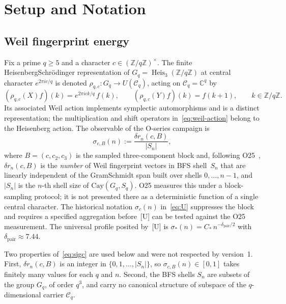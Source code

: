 \documentclass[12pt,a4paper]{article}
\theoremstyle{definition}
\theoremstyle{remark}
\DeclareMathOperator{\Heis}{Heis}
\newcommand{\Cq}{\mathcal{C}_q}
\newcommand{\dpair}{\delta_{\mathrm{pair}}}
\newcommand{\rhoc}{\rho_{q,c}}
\newcommand{\sigc}{\sigma_c}
\begin{document}
  \section{Setup and Notation}\label{sec:setup}

    \subsection{Weil fingerprint energy}

      Fix a prime $q \geq 5$ and a character $c \in (\mathbb{Z}/q\mathbb{Z})^\times$.
      The finite Heisenberg\textendash Schr\"odinger representation of
      $G_q = \Heis_3(\mathbb{Z}/q\mathbb{Z})$ at central character
      $e^{2\pi i c/q}$ is denoted $\rhoc : G_q \to U(\Cq)$, acting on $\Cq = \mathbb{C}^q$ by
      \begin{equation}\label{eq:weil-action}
        (\rhoc(X)f)(k) = e^{2\pi i ck/q}\,f(k), \qquad
        (\rhoc(Y)f)(k) = f(k+1), \qquad k \in \mathbb{Z}/q\mathbb{Z}.
      \end{equation}
      Its associated Weil action implements symplectic automorphisms and is a distinct
      representation; the multiplication and shift operators in~\eqref{eq:weil-action}
      belong to the Heisenberg action.
      The observable of the O-series campaign is
      \begin{equation}\label{eq:sigc}
        \sigma_{c,B}(n) := \frac{\delta r_n(c,B)}{|S_n|},
      \end{equation}
      where $B=(c,c_2,c_3)$ is the sampled three-component block and, following
      O25~\cite{Beau2026a29}, $\delta r_n(c,B)$ is the \emph{number} of Weil
      fingerprint vectors in BFS shell~$S_n$ that are linearly independent of the
      Gram\textendash Schmidt span built over shells $0,\dots,n-1$, and $|S_n|$ is the $n$-th
      shell size of $\mathrm{Cay}(G_q, S_q)$.
      O25 measures this under a block-sampling protocol; it is not presented there as a
      deterministic function of a single central character.
      The historical notation
      $\sigc(n)$ in~\eqref{eq:U} suppresses the block and requires a specified aggregation
      before~[U] can be tested against the O25 measurement.
      The universal profile posited by~[U] is $\sigma_*(n) = C_*\,n^{-\dpair/2}$ with
      $\dpair \approx 7.44$.

      Two properties of~\eqref{eq:sigc} are used below and were not respected by version~1.
      First, $\delta r_n(c,B)$ is an integer in $\{0,1,\dots,|S_n|\}$, so
      $\sigma_{c,B}(n) \in [0,1]$
      takes finitely many values for each $q$ and $n$.
      Second, the BFS shells $S_n$ are subsets of the group $G_q$, of order $q^3$, and carry
      no canonical structure of subspace of the $q$-dimensional carrier $\Cq$.
\end{document}
